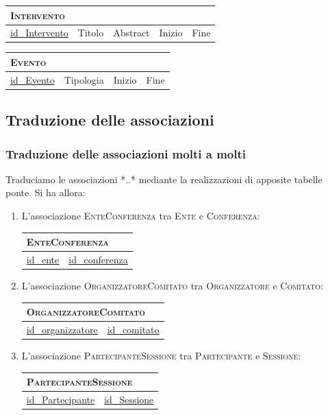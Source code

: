 	\begin{tabular}{|l|l|l|l|l|}
		\multicolumn{5}{l}{\textsc{Intervento}} \\ \hline
		\underline{id\_Intervento} & Titolo & Abstract & Inizio & Fine \\ \hline
	\end{tabular}


	\begin{tabular}{|l|l|l|l|}
		\multicolumn{4}{l}{\textsc{Evento}} \\ \hline
		\underline{id\_Evento} & Tipologia & Inizio & Fine \\ \hline
	\end{tabular}

\subsection{Traduzione delle associazioni}
\subsubsection{Traduzione delle associazioni molti a molti}
Traduciamo le associazioni *..* mediante la realizzazioni di apposite tabelle ponte. Si ha allora:
\begin{enumerate}
	\item L'associazione \textsc{EnteConferenza} tra \textsc{Ente} e \textsc{Conferenza}:

		\begin{tabular}{|l|l|}
			\multicolumn{2}{l}{\textsc{EnteConferenza}} \\ \hline
			\underline{\underline{id\_ente}} & \underline{\underline{id\_conferenza}} \\ \hline
		\end{tabular}

\item L'associazione \textsc{OrganizzatoreComitato} tra \textsc{Organizzatore} e \textsc{Comitato}:

	\begin{tabular}{|l|l|}
		\multicolumn{2}{l}{\textsc{OrganizzatoreComitato}} \\ \hline
		\underline{\underline{id\_organizzatore}} & \underline{\underline{id\_comitato}} \\ \hline
	\end{tabular}

\item L'associazione \textsc{PartecipanteSessione} tra \textsc{Partecipante} e \textsc{Sessione}:

	\begin{tabular}{|l|l|}
		\multicolumn{2}{l}{\textsc{PartecipanteSessione}} \\ \hline
		\underline{\underline{id\_Partecipante}} & \underline{\underline{id\_Sessione}} \\ \hline
	\end{tabular}

\end{enumerate}
